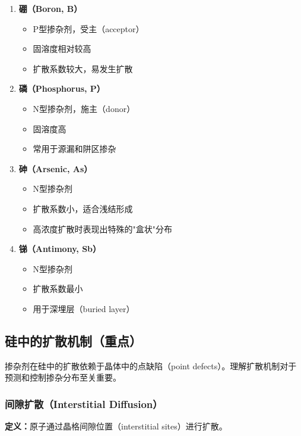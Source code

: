 \documentclass[UTF8,12pt,a4paper]{ctexart}
\begin{document}
\begin{enumerate}
    \item \textbf{硼（Boron, B）}
    \begin{itemize}
        \item P型掺杂剂，受主（acceptor）
        \item 固溶度相对较高
        \item 扩散系数较大，易发生扩散
    \end{itemize}
    
    \item \textbf{磷（Phosphorus, P）}
    \begin{itemize}
        \item N型掺杂剂，施主（donor）
        \item 固溶度高
        \item 常用于源漏和阱区掺杂
    \end{itemize}
    
    \item \textbf{砷（Arsenic, As）}
    \begin{itemize}
        \item N型掺杂剂
        \item 扩散系数小，适合浅结形成
        \item 高浓度扩散时表现出特殊的"盒状"分布
    \end{itemize}
    
    \item \textbf{锑（Antimony, Sb）}
    \begin{itemize}
        \item N型掺杂剂
        \item 扩散系数最小
        \item 用于深埋层（buried layer）
    \end{itemize}
\end{enumerate}

\subsection{硅中的扩散机制（重点）}

掺杂剂在硅中的扩散依赖于晶体中的点缺陷（point defects）。理解扩散机制对于预测和控制掺杂分布至关重要。

\subsubsection{间隙扩散（Interstitial Diffusion）}

\textbf{定义：}原子通过晶格间隙位置（interstitial sites）进行扩散。
\end{document}
